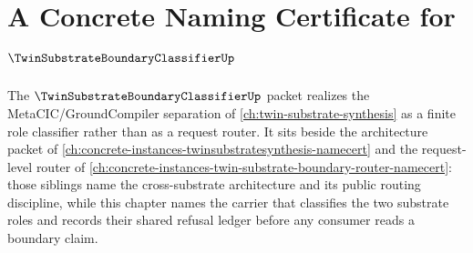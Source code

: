 \chapter{A Concrete Naming Certificate for $\TwinSubstrateBoundaryClassifierUp$}
\label{ch:concrete-instances-twinsubstrateboundaryclassifier-namecert}


The $\TwinSubstrateBoundaryClassifierUp$ packet realizes the MetaCIC/GroundCompiler separation of \autoref{ch:twin-substrate-synthesis} as a finite role classifier rather than as a request router. It sits beside the architecture packet of \autoref{ch:concrete-instances-twinsubstratesynthesis-namecert} and the request-level router of \autoref{ch:concrete-instances-twin-substrate-boundary-router-namecert}: those siblings name the cross-substrate architecture and its public routing discipline, while this chapter names the carrier that classifies the two substrate roles and records their shared refusal ledger before any consumer reads a boundary claim.

